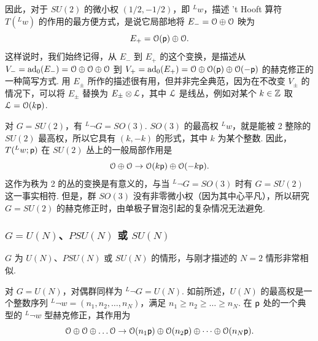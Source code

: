 因此，对于 $SU(2)$ 的微小权 $(1/2,-1/2)$，即 $^Lw$，描述 't Hooft 算符 $T(^Lw)$ 的作用的最方便方式，是说它局部地将 $E_-={\mathcal O}\oplus {\mathcal O}$ 映为
\begin{equation}\label{inrtz}E_+={\mathcal O}({\sf p})\oplus {\mathcal O}. \end{equation}
这样说时，我们始终记得，从 $E_-$ 到 $E_+$ 的这个变换，是描述从 $V_-={\rm ad}_0(E_-)={\mathcal O}\oplus {\mathcal O}\oplus {\mathcal O}$ 到 $V_+={\rm ad}_0(E_+)={\mathcal O}\oplus {\mathcal O}({\sf p})\oplus {\mathcal O}(-{\sf p})$ 的赫克修正的一种简写方式.
用 $E_\pm$ 所作的描述很有用，但并非完全典范，因为在不改变 $V_\pm$ 的情况下，可以将 $E_\pm$ 替换为 $E_\pm \otimes {\mathcal L}$，其中 ${\mathcal L}$ 是线丛，例如对某个 $k\in {\mathbb Z}$ 取 ${\mathcal L}={\mathcal O}(k{\sf p})$.


对 $G=SU(2)$，有 $^L\neg G=SO(3)$.
$SO(3)$ 的最高权 $^Lw$，就是能被 2 整除的 $SU(2)$ 最高权，所以它具有 $(k,-k)$ 的形式，其中 $k$ 为某个整数.
因此，$T(^Lw;{\sf p})$ 在 $SU(2)$ 丛上的一般局部作用是
\begin{equation}\label{zobbo}{\mathcal O}\oplus{\mathcal O}\to {\mathcal O}(k{\sf p})\oplus {\mathcal O}(-k{\sf p}). \end{equation}
这作为秩为 2 的丛的变换是有意义的，与当 $^L\neg G=SO(3)$ 时有 $G=SU(2)$ 这一事实相符.
但是，群 $SO(3)$ 没有非零微小权（因为其中心平凡），所以研究 $G=SU(2)$ 的赫克修正时，由单极子冒泡引起的复杂情况无法避免.

\subsubsection{$G=U(N)$、$PSU(N)$ 或 $SU(N)$}\label{zoff}

$G$ 为 $U(N)$、$PSU(N)$ 或 $SU(N)$ 的情形，与刚才描述的 $N=2$ 情形非常相似.

对 $G=U(N)$，对偶群同样为 $^L\neg G=U(N)$.
如前所述，$U(N)$ 的最高权是一个整数序列 $^L\neg w=(n_1,n_2,\dots, n_N)$，满足 $n_1\geq n_2\geq\dots
\geq n_N$.
在 ${\sf p}$ 处的一个典型的 $^L\neg w$ 型赫克修正，其作用为
\begin{equation}\label{omb} {\mathcal O}\oplus {\mathcal O}\oplus \dots {\mathcal O} \to {\mathcal O}(n_1{\sf p})\oplus {\mathcal O}(n_2{\sf p})\oplus \dots \oplus {\mathcal O}(n_N{\sf p}). \end{equation}

